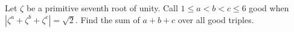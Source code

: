 Let $\zeta$ be a primitive seventh root of unity. Call $1\le a<b<c\le6$ good when $|\zeta^a+\zeta^b+\zeta^c|=\sqrt2$. Find the sum of $a+b+c$ over all good triples.
